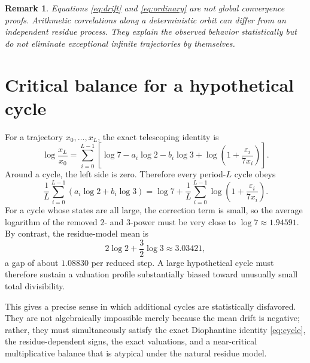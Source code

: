 \documentclass[11pt]{article}
\newtheorem{remark}{Remark}
\begin{document}
\begin{remark}
Equations \eqref{eq:drift} and \eqref{eq:ordinary} are not global convergence proofs. Arithmetic correlations along a deterministic orbit can differ from an independent residue process. They explain the observed behavior statistically but do not eliminate exceptional infinite trajectories by themselves.
\end{remark}

\section{Critical balance for a hypothetical cycle}
For a trajectory $x_0,\ldots,x_L$, the exact telescoping identity is
\begin{equation}
\log\frac{x_L}{x_0}
=\sum_{i=0}^{L-1}\left[
\log7-a_i\log2-b_i\log3+
\log\left(1+\frac{\varepsilon_i}{7x_i}\right)
\right].
\label{eq:telescoping}
\end{equation}
Around a cycle, the left side is zero. Therefore every period-$L$ cycle obeys
\begin{equation}
\frac1L\sum_{i=0}^{L-1}(a_i\log2+b_i\log3)
=\log7+\frac1L\sum_{i=0}^{L-1}
\log\left(1+\frac{\varepsilon_i}{7x_i}\right).
\label{eq:cycle-balance}
\end{equation}
For a cycle whose states are all large, the correction term is small, so the average logarithm of the removed $2$- and $3$-power must be very close to $\log7\approx1.94591$. By contrast, the residue-model mean is
\[
2\log2+\frac32\log3\approx3.03421,
\]
a gap of about $1.08830$ per reduced step. A large hypothetical cycle must therefore sustain a valuation profile substantially biased toward unusually small total divisibility.

This gives a precise sense in which additional cycles are statistically disfavored. They are not algebraically impossible merely because the mean drift is negative; rather, they must simultaneously satisfy the exact Diophantine identity \eqref{eq:cycle}, the residue-dependent signs, the exact valuations, and a near-critical multiplicative balance that is atypical under the natural residue model.
\end{document}
